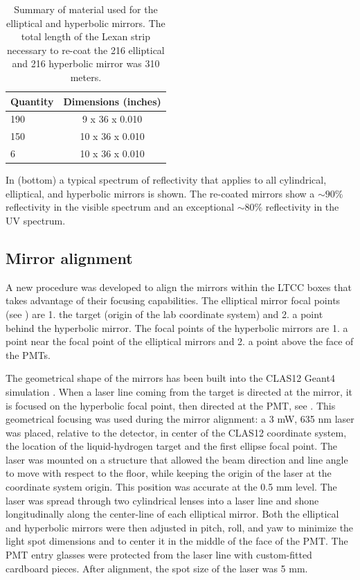 \begin{table}
	\begin{center}
		\begin{tabular}{| l | c |}
			\hline \hline
			Quantity  & Dimensions (inches) \\
			\hline
			190       & 9  x 36 x 0.010  \\
			150       & 10 x 36 x 0.010  \\
			6         & 10 x 36 x 0.010  \\
			\hline \hline
		\end{tabular}
	\end{center}
	\caption{Summary of material used for the elliptical and hyperbolic mirrors. The total length of the Lexan strip necessary to re-coat the 216 elliptical
            and 216 hyperbolic mirror was 310 meters.}\label{tab:strips}
\end{table}


In  (bottom) a typical spectrum of reflectivity that applies to all cylindrical, elliptical, and hyperbolic mirrors is shown.
The re-coated mirrors show a $\sim 90\%$ reflectivity in the visible spectrum and an exceptional $\sim 80\%$
reflectivity in the UV spectrum.



\subsection{Mirror alignment}

A new procedure was developed to align the mirrors within the LTCC boxes that takes advantage of their focusing capabilities.
The elliptical mirror focal points (see ) are 1. the target (origin of the lab coordinate system)
and 2. a point behind the hyperbolic mirror. The focal points of the hyperbolic mirrors are 1. a point near the focal point of the elliptical mirrors and
2. a point above the face of the PMTs.

The geometrical shape of the mirrors has been built into the CLAS12 Geant4 simulation \cite{sim-nim}.
When a laser line coming from the target is directed at the mirror,
it is focused on the hyperbolic focal point, then directed at the PMT, see .
This geometrical focusing was used during the mirror alignment: a 3 mW, 635 nm laser was placed, relative to the detector,
in center of the CLAS12 coordinate system, the location of the liquid-hydrogen target and the first ellipse focal point.
The laser was mounted on a structure that allowed the beam direction and line angle to move with respect to the floor, while keeping
the origin of the laser at the coordinate system origin.
This position was accurate at the 0.5 mm level. The laser was spread through two cylindrical lenses into a laser line and shone
longitudinally along the center-line of each elliptical mirror. Both the elliptical and hyperbolic mirrors were then
adjusted in pitch, roll, and yaw to minimize the light spot dimensions and to center it in the middle of the face of the PMT.
The PMT entry glasses were protected from the laser line with custom-fitted cardboard pieces. After alignment, the spot size of the laser was 5 mm.


